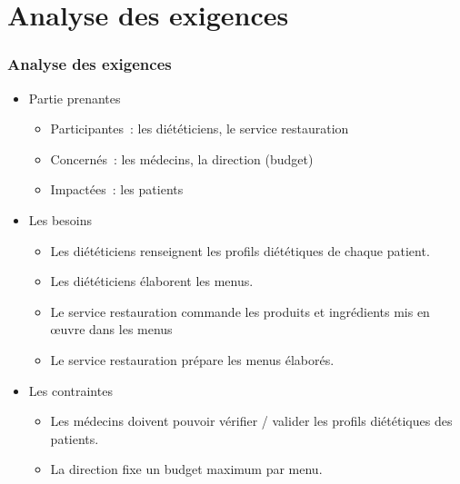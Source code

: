 \documentclass{beamer}
\begin{document}
\section{Analyse des exigences}
\begin{frame}[label=analyseDesExigences] %
\frametitle{Analyse des exigences}
\begin{itemize}
  \item Partie prenantes
  \begin{itemize}
    \item Participantes~: les diététiciens, le service restauration
    \item Concernés~: les médecins, la direction (budget)
    \item Impactées~: les patients
  \end{itemize}
  \item Les besoins
  \begin{itemize}
    \item Les diététiciens renseignent les profils diététiques de chaque patient.
    \item Les diététiciens élaborent les menus.
    \item Le service restauration commande les produits et ingrédients mis en œuvre dans les menus
    \item Le service restauration prépare les menus élaborés.
  \end{itemize}
  \item Les contraintes
  \begin{itemize}
    \item Les médecins doivent pouvoir vérifier / valider les profils diététiques des patients.
    \item La direction fixe un budget maximum par menu.
  \end{itemize}
\end{itemize}
\end{frame}
\end{document}
